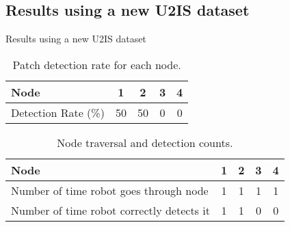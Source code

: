 \documentclass[aspectratio=169,hyperref={pdfpagelabels=false}]{beamer}
\begin{document}
    \subsection{Results using a new U2IS dataset}
    \begin{frame}{Results using a new U2IS dataset}
        \begin{adjustwidth}{-3.5em}{-1.5em}
            \begin{table}[ht!]
                \centering
                \begin{tabular}{|l|c|c|c|c|}
                    \hline
                    Node                & 1  & 2  & 3 & 4 \\ \hline
                    Detection Rate (\%) & 50 & 50 & 0 & 0 \\ \hline
                \end{tabular}
                \caption{Patch detection rate for each node.}
            \end{table}%
            \begin{table}[ht]
                \centering
                \begin{tabular}{|l|c|c|c|c|}
                    \hline
                    Node                                      & 1 & 2 & 3 & 4 \\ \hline
                    Number of time robot goes through node    & 1 & 1 & 1 & 1 \\ \hline
                    Number of time robot correctly detects it & 1 & 1 & 0 & 0 \\ \hline
                \end{tabular}
                \caption{Node traversal and detection counts.}
            \end{table}%
        \end{adjustwidth}
    \end{frame}
\end{document}
